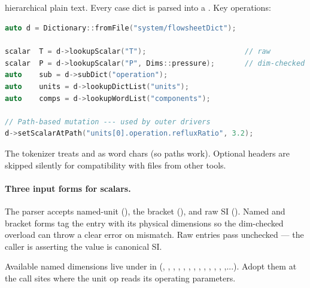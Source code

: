 \documentclass[11pt,a4paper]{article}
\begin{document}
\subsection{}

hierarchical plain text. Every case dict is parsed into a
. Key operations:

\begin{lstlisting}[language=C++]
auto d = Dictionary::fromFile("system/flowsheetDict");

scalar  T = d->lookupScalar("T");                       // raw
scalar  P = d->lookupScalar("P", Dims::pressure);       // dim-checked
auto    sub = d->subDict("operation");
auto    units = d->lookupDictList("units");
auto    comps = d->lookupWordList("components");

// Path-based mutation --- used by outer drivers
d->setScalarAtPath("units[0].operation.refluxRatio", 3.2);
\end{lstlisting}

The tokenizer treats \code{[} and \code{]} as word chars (so paths
work). Optional  headers are skipped silently for
compatibility with files from other tools.

\paragraph{Three input forms for scalars.} The parser
accepts named-unit (), the bracket
(), and raw SI ().
Named and bracket forms tag the entry with its physical dimensions
\code{[M L T Theta N]} so the dim-checked
 overload can throw a
clear error on mismatch.  Raw entries pass unchecked --- the
caller is asserting the value is canonical SI.

Available named dimensions live under  in
 (, ,
, , , ,
, , ,
, , ,
,...).  Adopt them at the call sites where
the unit op reads its operating parameters.

\subsection{}
\end{document}
